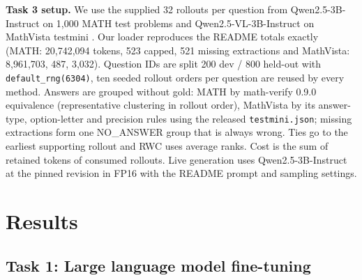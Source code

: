 \documentclass{article}
\begin{document}
\textbf{Task 3 setup.} We use the supplied 32 rollouts per question from Qwen2.5-3B-Instruct on 1{,}000 MATH test problems \citep{hendrycks2021math} and Qwen2.5-VL-3B-Instruct \citep{bai2025qwen25vl} on MathVista testmini \citep{lu2024mathvista}. Our loader reproduces the README totals exactly (MATH: 20{,}742{,}094 tokens, 523 capped, 521 missing extractions and MathVista: 8{,}961{,}703, 487, 3{,}032). Question IDs are split 200 dev / 800 held-out with \texttt{default\_rng(6304)}, ten seeded rollout orders per question are reused by every method. Answers are grouped without gold: MATH by math-verify 0.9.0 equivalence (representative clustering in rollout order), MathVista by its answer-type, option-letter and precision rules using the released \texttt{testmini.json}; missing extractions form one NO\_ANSWER group that is always wrong. Ties go to the earliest supporting rollout and RWC uses average ranks. Cost is the sum of retained tokens of consumed rollouts. Live generation uses Qwen2.5-3B-Instruct at the pinned revision in FP16 with the README prompt and sampling settings.

\section{Results}
\subsection{Task 1: Large language model fine-tuning}
\end{document}
